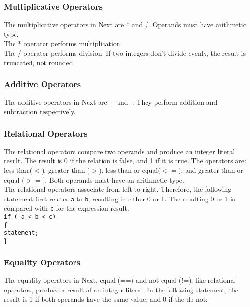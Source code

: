 \documentclass[12pt]{article}
\begin{document}
\subsubsection{Multiplicative Operators}
The multiplicative operators in Next are * and /.  Operands must have arithmetic type. \\

\noindent The * operator performs multiplication. \\

\noindent The / operator performs division.  If two integers don't divide evenly, the result is truncated, not rounded.

\subsubsection{Additive Operators}
The additive operators in Next are + and -.  They perform addition and subtraction respectively.

\subsubsection{Relational Operators}
The relational operators compare two operands and produce an integer literal result.  The result is 0 if the relation is false, and 1 if it is true.  The operators are: less than($<$), greater than ($>$), less than or equal($<=$), and greater than or equal ($>=$).  Both operands must have an arithmetic type. \\

\noindent The relational operators associate from left to right.  Therefore, the following statement first relates \texttt{a} to \texttt{b}, resulting in either 0 or 1.  The resulting 0 or 1 is compared with \texttt{c} for the expression result. \\

\texttt{if ( a < b < c) \\
\indent \{ \\
\indent \indent statement; \\
\indent \} }

\subsubsection{Equality Operators}
The equality operators in Next, equal (==) and not-equal (!=), like relational operators, produce a result of an integer literal.  In the following statement, the result is 1 if both operands have the same value, and 0 if the do not: \\
\end{document}
